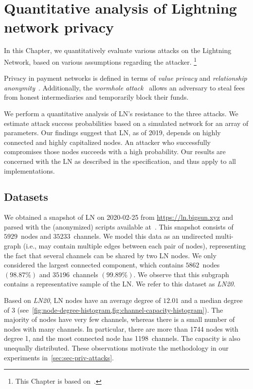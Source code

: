 \chapter{Quantitative analysis of Lightning network privacy}

\label{Chapter07LNattacks}

In this Chapter, we quantitatively evaluate various attacks on the Lightning Network, based on various assumptions regarding the attacker.
\footnote{This Chapter is based on~\cite{Tikhomirov2020a}.}

Privacy in payment networks is defined in terms of \textit{value privacy} and \textit{relationship anonymity}~\cite{Malavolta2017}.
Additionally, the \textit{wormhole attack}~\cite{Malavolta2019} allows an adversary to steal fees from honest intermediaries and temporarily block their funds.

We perform a quantitative analysis of LN's resistance to the three attacks.
We estimate attack success probabilities based on a simulated network for an array of parameters.
Our findings suggest that LN, as of 2019, depends on highly connected and highly capitalized nodes.
An attacker who successfully compromises those nodes succeeds with a high probability.
Our results are concerned with the LN as described in the specification, and thus apply to all implementations.


\section{Datasets}
\label{sec:datasets}

We obtained a snapshot of LN on 2020-02-25 from \url{https://ln.bigsun.xyz} and parsed with the (anonymized) scripts available at~\cite{Tikhomirov2019}.
This snapshot consists of $5929$~nodes and $35233$~channels.
We model this data as an undirected multi-graph (i.e., may contain multiple edges between each pair of nodes), 
representing the fact that several channels can be shared by two LN nodes.
We only considered the largest connected component, 
which contains $5862$~nodes $(98.87\%)$ and $35196$~channels $(99.89\%)$.
We observe that this subgraph contains a representative sample of the LN.
We refer to this dataset as \emph{LN20}.

Based on \emph{LN20}, 
LN nodes have an average degree of $12.01$ and a median degree of $3$ (see~\cref{fig:node-degree-histogram,fig:channel-capacity-histogram}).
The majority of nodes have very few channels, 
whereas there is a small number of nodes with many channels. 
In particular, there are more than 1744 nodes with degree 1, and the most connected node has 1198~channels.
The capacity is also unequally distributed.
These observations motivate the methodology in our experiments in~\cref{sec:sec-priv-attacks}. 

